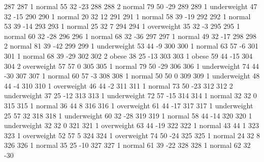 \begin{Schunk}
\begin{Soutput}
		287         287   1      normal  55         32          -23
		288         288   2      normal  79         50          -29
		289         289   1 underweight  47         32          -15
		290         290   1      normal  20         32           12
		291         291   1      normal  58         39          -19
		292         292   1      normal  53         39          -14
		293         293   1      normal  25         32            7
		294         294   1  overweight  35         32           -3
		295         295   1      normal  60         32          -28
		296         296   1      normal  68         32          -36
		297         297   1      normal  49         32          -17
		298         298   2      normal  81         39          -42
		299         299   1 underweight  53         44           -9
		300         300   1      normal  63         57           -6
		301         301   1      normal  68         39          -29
		302         302   2       obese  38         25          -13
		303         303   1       obese  59         44          -15
		304         304   2  overweight  57         57            0
		305         305   1      normal  79         50          -29
		306         306   1 underweight  74         44          -30
		307         307   1      normal  60         57           -3
		308         308   1      normal  50         50            0
		309         309   1 underweight  48         44           -4
		310         310   1  overweight  46         44           -2
		311         311   1      normal  73         50          -23
		312         312   2 underweight  37         25          -12
		313         313   1 underweight  72         57          -15
		314         314   1      normal  32         32            0
		315         315   1      normal  36         44            8
		316         316   1  overweight  61         44          -17
		317         317   1 underweight  25         57           32
		318         318   1 underweight  60         32          -28
		319         319   1      normal  58         44          -14
		320         320   1 underweight  32         32            0
		321         321   1  overweight  63         44          -19
		322         322   1      normal  43         44            1
		323         323   1  overweight  52         57            5
		324         324   1  overweight  74         50          -24
		325         325   1      normal  24         32            8
		326         326   1      normal  35         25          -10
		327         327   1      normal  61         39          -22
		328         328   1      normal  62         32          -30

\end{Soutput}
\end{Schunk}
